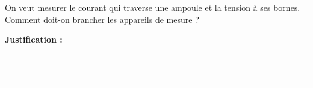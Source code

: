 On veut mesurer le courant qui traverse une ampoule et la tension à ses bornes. Comment doit-on brancher les appareils de mesure ?

\choices

\noindent\textbf{Justification :} \hrulefill \\[2.5ex]
\rule{\linewidth}{0.4pt} \\[2.5ex]
\rule{\linewidth}{0.4pt}
\vfill
